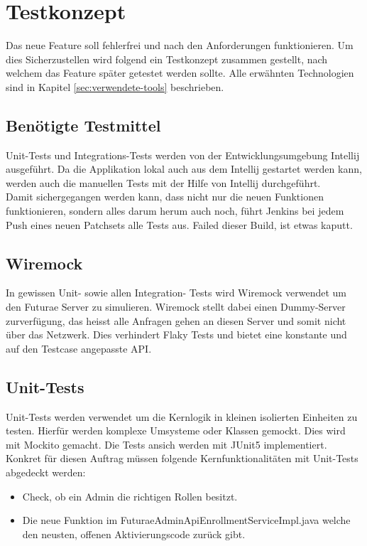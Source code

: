 \section{Testkonzept} \label{sec:testkonzept}
Das neue Feature soll fehlerfrei und nach den Anforderungen funktionieren. Um dies Sicherzustellen wird folgend ein Testkonzept zusammen gestellt, nach welchem das Feature später getestet werden sollte.
Alle erwähnten Technologien sind in Kapitel \ref{sec:verwendete-tools} beschrieben.


\subsection{Benötigte Testmittel}
Unit-Tests und Integrations-Tests werden von der Entwicklungsumgebung Intellij ausgeführt. Da die Applikation lokal auch aus dem Intellij gestartet werden kann, werden auch die manuellen Tests mit der Hilfe von Intellij durchgeführt.  \newline
\\
Damit sichergegangen werden kann, dass nicht nur die neuen Funktionen funktionieren, sondern alles darum herum auch noch, führt Jenkins bei jedem Push eines neuen Patchsets alle Tests aus. Failed dieser Build, ist etwas kaputt.

\subsection{Wiremock} \label{subsec:wiremock}
In gewissen Unit- sowie allen Integration- Tests wird Wiremock verwendet um den Futurae Server zu simulieren. Wiremock stellt dabei einen Dummy-Server zurverfügung, das heisst alle Anfragen gehen an diesen Server und somit nicht über das Netzwerk. Dies verhindert Flaky Tests und bietet eine konstante und auf den Testcase angepasste API. 

\subsection{Unit-Tests}
Unit-Tests werden verwendet um die Kernlogik in kleinen isolierten Einheiten zu testen. Hierfür werden komplexe Umsysteme oder Klassen gemockt. Dies wird mit Mockito gemacht. Die Tests ansich werden mit JUnit5 implementiert. Konkret für diesen Auftrag müssen folgende Kernfunktionalitäten mit Unit-Tests abgedeckt werden:
\begin{itemize}
	\item Check, ob ein Admin die richtigen Rollen besitzt.
	\item Die neue Funktion im FuturaeAdminApiEnrollmentServiceImpl.java welche den neusten, offenen Aktivierungscode zurück gibt.	
\end{itemize}

